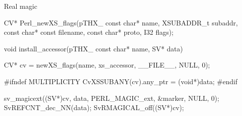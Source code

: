 \documentclass[mathserif,hyperref={urlcolor=cyan,colorlinks=true}]{beamer}
\begin{document}
\begin{frame}[fragile]{Real magic}

\begin{ccode}
CV*
Perl_newXS_flags(pTHX_ const char* name, XSUBADDR_t subaddr,
    const char* const filename, const char* proto, I32 flags);

void
install_accessor(pTHX_ const char* name, SV* data) {
    CV* cv = newXS_flags(name, xs_accessor, __FILE__, NULL, 0);

#ifndef MULTIPLICITY
    CvXSSUBANY(cv).any_ptr = (void*)data;
#endif

    sv_magicext((SV*)cv, data, PERL_MAGIC_ext, &marker, NULL, 0);
    SvREFCNT_dec_NN(data);
    SvRMAGICAL_off((SV*)cv);
}
\end{ccode}
\end{frame}

\begin{frame}{}
\end{frame}
\end{document}
